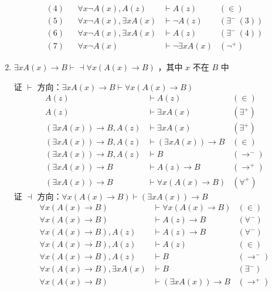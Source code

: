 \documentclass[UTF8]{ctexart}
\begin{document}
\begin{enumerate}
\begin{align*}
            (4) && \forall x \lnot A(x), A(z) & \vdash A(z) & (\in) \\
            (5) && \forall x \lnot A(x), \exists x A(x) & \vdash \lnot A(z) & (\exists^{-}\ (3)) \\
            (6) && \forall x \lnot A(x), \exists x A(x) & \vdash A(z) & (\exists^{-}\ (4)) \\
            (7) && \forall x \lnot A(x) & \vdash \lnot \exists x A(x) & (\lnot^{+})
        \end{align*}
        \newpage
        \item $\exists x A(x) \to B \vdash \dashv \forall x (A(x) \to B)$ ，其中 $x$ 不在 $B$ 中 \par
        证 $\vdash$ 方向：$\exists x A(x) \to B \vdash \forall x (A(x) \to B)$
        \begin{align*}
            A(z) & \vdash A(z) & (\in) \\
            A(z) & \vdash \exists x A(x) & (\exists^{+}) \\
            (\exists x A(x)) \to B, A(z) & \vdash \exists x A(x) & (\exists^{+}) \\
            (\exists x A(x)) \to B, A(z) & \vdash (\exists x A(x)) \to B & (\in) \\
            (\exists x A(x)) \to B, A(z) & \vdash B & (\to^{-}) \\
            (\exists x A(x)) \to B & \vdash A(z) \to B & (\to^{+}) \\
            (\exists x A(x)) \to B & \vdash \forall x (A(x) \to B) & (\forall^{+})
        \end{align*}
        证 $\dashv$ 方向：$\forall x (A(x) \to B) \vdash (\exists x A(x)) \to B$
        \begin{align*}
            \forall x(A(x) \to B) & \vdash \forall x (A(x) \to B) & (\in) \\
            \forall x(A(x) \to B) & \vdash A(z) \to B & (\forall^{-}) \\
            \forall x(A(x) \to B), A(z) & \vdash A(z) \to B & (\forall^{-}) \\
            \forall x(A(x) \to B), A(z) & \vdash A(z) & (\in) \\
            \forall x(A(x) \to B), A(z) & \vdash B & (\to^{-}) \\
            \forall x(A(x) \to B), \exists x A(x) & \vdash B & (\exists^{-}) \\
            \forall x(A(x) \to B) & \vdash (\exists x A(x)) \to B & (\to^{+})
        \end{align*}
    \end{enumerate}
    
\end{document}
